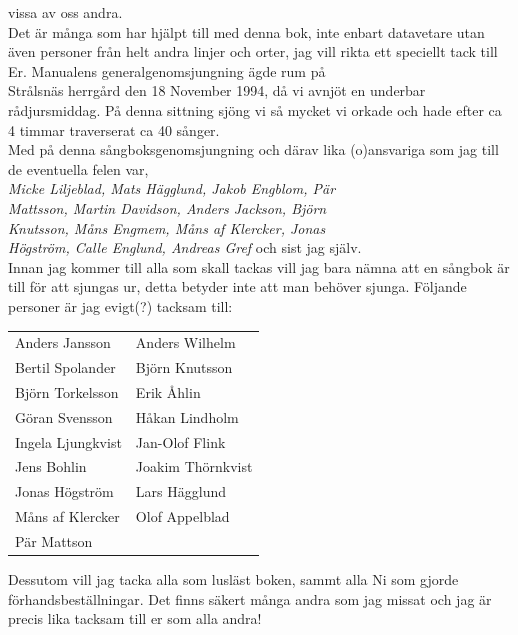 \documentclass[a6paper,fontsize=10pt,twoside,open=right]{scrbook}
\begin{document}
vissa av oss andra.\\ \indent Det är många som har hjälpt till med
denna bok, inte enbart datavetare utan även personer från helt andra
linjer och orter, jag vill rikta ett speciellt tack till Er.
\newpage
\indent Manualens generalgenomsjungning ägde rum på\\ Strålsnäs
herrgård den 18 November 1994, då vi avnjöt en underbar
rådjursmiddag. På denna sittning sjöng vi så mycket vi orkade och hade
efter ca 4 timmar traverserat ca 40 sånger.\\ \indent Med på denna
sångboksgenomsjungning och därav lika (o)ansvariga som jag till de
eventuella felen var,\\ \textit{Micke Liljeblad, Mats Hägglund, Jakob
  Engblom, Pär\\ Mattsson, Martin Davidson, Anders Jackson,
  Björn\\ Knutsson, Måns Engmem, Måns af Klercker, Jonas\\ Högström,
  Calle Englund, Andreas Gref} och sist jag själv.\\ \indent Innan jag
kommer till alla som skall tackas vill jag bara nämna att en sångbok
är till för att sjungas ur, detta betyder inte att man behöver
sjunga. Följande personer är jag evigt(?)  tacksam till:\\

\noindent
\begin{tabular}{@{}p{}p{}@{}}
  Anders Jansson & Anders Wilhelm\\
  Bertil Spolander & Björn Knutsson\\
  Björn Torkelsson & Erik Åhlin\\
  Göran Svensson & Håkan Lindholm\\
  Ingela Ljungkvist & Jan-Olof Flink\\
  Jens Bohlin & Joakim Thörnkvist\\
  Jonas Högström & Lars Hägglund\\
  Måns af Klercker & Olof Appelblad\\
  Pär Mattson
\end{tabular}
\newpage
\indent Dessutom vill jag tacka alla som lusläst boken, sammt alla Ni
som gjorde förhandsbeställningar. Det finns säkert många andra som jag
missat och jag är precis lika tacksam till er som alla
andra!\\
\end{document}
